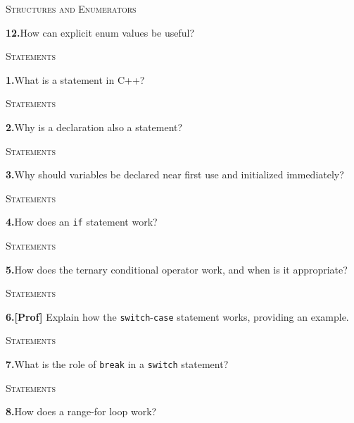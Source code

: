 \documentclass[11pt,a4paper]{article}
\newenvironment{questionblock}{%
  \begin{minipage}[t][0.455\textheight][t]{\textwidth}%
  \raggedright\small
}{%
  \vfill
  \end{minipage}%
}
\newcommand{\sectionlabel}[1]{\textsc{#1}\par\vspace{0.35em}}
\newcommand{\questionnumber}[1]{\textbf{#1.}\enspace}
\begin{document}
\newpage
\begin{questionblock}
\sectionlabel{Structures and Enumerators}
\questionnumber{12}How can explicit enum values be useful?\par

\end{questionblock}
\vspace*{0.04\textheight}
\begin{questionblock}
\sectionlabel{Statements}
\questionnumber{1}What is a statement in C++?\par
\end{questionblock}
\newpage
\begin{questionblock}
\sectionlabel{Statements}
\questionnumber{2}Why is a declaration also a statement?\par
\end{questionblock}
\vspace*{0.04\textheight}
\begin{questionblock}
\sectionlabel{Statements}
\questionnumber{3}Why should variables be declared near first use and initialized immediately?\par
\end{questionblock}
\newpage
\begin{questionblock}
\sectionlabel{Statements}
\questionnumber{4}How does an \verb|if| statement work?\par
\end{questionblock}
\vspace*{0.04\textheight}
\begin{questionblock}
\sectionlabel{Statements}
\questionnumber{5}How does the ternary conditional operator work, and when is it appropriate?\par
\end{questionblock}
\newpage
\begin{questionblock}
\sectionlabel{Statements}
\questionnumber{6}\textbf{[Prof]} Explain how the \verb|switch|-\verb|case| statement works, providing an example.\par
\end{questionblock}
\vspace*{0.04\textheight}
\begin{questionblock}
\sectionlabel{Statements}
\questionnumber{7}What is the role of \verb|break| in a \verb|switch| statement?\par
\end{questionblock}
\newpage
\begin{questionblock}
\sectionlabel{Statements}
\questionnumber{8}How does a range-for loop work?\par
\end{questionblock}
\end{document}
